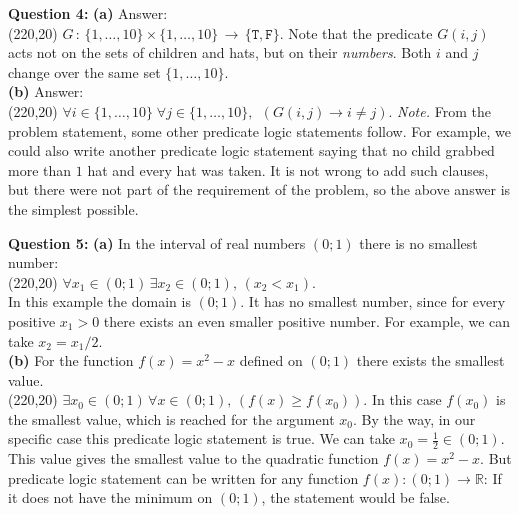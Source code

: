 \documentclass[jou]{apa6}
\begin{document}
\vspace{10pt}
{\bf Question 4:} {\bf (a)} Answer:\\[5pt]
\framebox(220,20){
$G\,:\, \{ 1,\ldots,10\} \times \{ 1,\ldots,10\} 
\,\rightarrow\, \{ \mathtt{T}, \mathtt{F} \}$.
}
Note that the predicate $G(i,j)$ acts not on the sets of children and hats, but 
on their {\em numbers}. Both $i$ and $j$ change over the same set $\{ 1,\ldots,10\}$.\\
{\bf (b)} Answer:\\[5pt]
\framebox(220,20){
$\forall i \in \{ 1,\ldots,10\}\; \forall j \in \{ 1,\ldots,10\},\; \,\left( G(i,j) \rightarrow i \neq j \right).$
}
{\em Note.} From the problem statement, some other predicate logic statements follow.
For example, we could also write another predicate logic statement saying that no child 
grabbed more than $1$ hat and every hat was taken. It is not wrong to add such clauses, 
but there were not part of the requirement of the problem, so the above answer is the 
simplest possible.

\vspace{10pt}
{\bf Question 5:} 
{\bf (a)} In the interval of real numbers $(0;1)$ there is no smallest number:\\[5pt]
\framebox(220,20){
$\forall x_1 \in (0;1)\, \exists x_2 \in (0;1),\, \left( x_2 < x_1 \right)$.
}\\
In this example the domain is $(0;1)$. It has no smallest number, since for every positive $x_1 > 0$
there exists an even smaller positive number. For example, we can take $x_2 = x_1/2$.\\
{\bf (b)} For the function $f(x) = x^2 - x$ defined on $(0;1)$ there exists the smallest value.\\[5pt]
\framebox(220,20){
$\exists x_0 \in (0;1)\,\forall x \in (0;1),\,\left( f(x) \geq f(x_0) \right)$.
}
In this case $f(x_0)$ is the smallest value, which is reached for the argument $x_0$. 
By the way, in our specific case this predicate logic statement is true. 
We can take $x_0 = \frac{1}{2} \in (0;1)$. This value gives the smallest value to 
the quadratic function $f(x) = x^2 - x$. But predicate logic statement can be written for 
any function $f(x): (0;1)\rightarrow \mathbb{R}$: 
If it does not have the minimum on $(0;1)$, the statement would be false.
\end{document}
